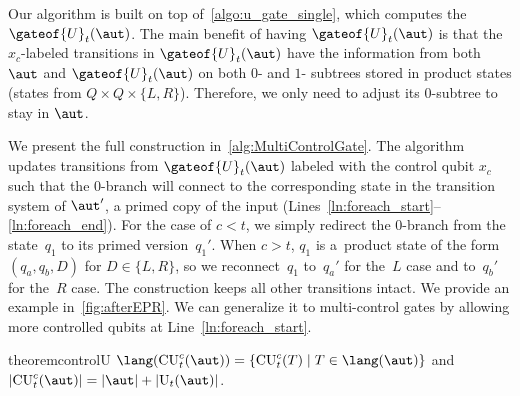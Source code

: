
\figCXGate  %

Our algorithm is built on top of~\cref{algo:u_gate_single}, which
computes the \lsta $\gateof{U}_t(\aut)$.
The main benefit of having $\gateof{U}_t(\aut)$ is that the $x_c$-labeled
transitions in $\gateof{U}_t(\aut)$ have the information from both $\aut$ and
$\gateof{U}_t(\aut)$ on both $0$- and $1$- subtrees stored in product states
(states from $Q\times Q\times \{L,R\}$).
Therefore, we only need to adjust its $0$-subtree to stay in $\aut$.

We present the full construction in~\cref{alg:MultiControlGate}.
The algorithm updates transitions from $\gateof{U}_t(\aut)$ labeled with the control qubit $x_c$ such that the
$0$-branch will connect to the corresponding state in the transition system of
$\aut'$, a primed copy of the input \lsta
(Lines~\ref{ln:foreach_start}--\ref{ln:foreach_end}). For the case of $c<t$, we
simply redirect the $0$-branch from the state~$q_1$ to its primed version~$q_1'$.
When $c>t$, $q_1$ is a~product state of the form $(q_a, q_b, D)$ for $D \in
\{L,R\}$,
so we reconnect~$q_1$ to~$q_a'$ for the~$L$ case and to~$q_b'$ for the~$R$ case. The
construction keeps all other transitions intact. We provide an example in~\cref{fig:afterEPR}. 
\algControlUniversalGate
We can generalize it to multi-control gates by allowing more controlled qubits at
Line~\ref{ln:foreach_start}.

\vspace{-1mm}
 \begin{restatable}{theorem}{controlU}\label{thm:controlU}
 	$\lang( \mathrm{CU}^c_t(\aut) )  = \{\mathrm{CU}^c_t(T) \mid  T\in \lang(\aut)
   \}$ and $|\mathrm{CU}_t^c(\aut)|=|\aut|+|\mathrm{U}_t(\aut)|$.
 \end{restatable}


